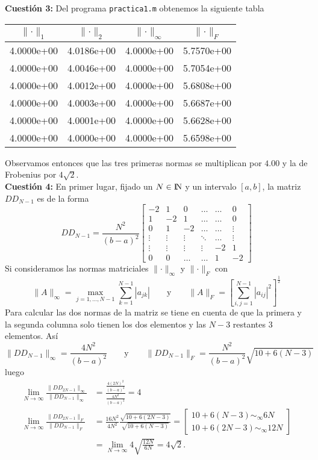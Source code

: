 \documentclass[12pt]{article}
\newcommand{\NN}{{\rm I\!N}}
\newcommand{\abs}[1]{\left|#1\right|}
\newcommand{\norm}[1]{\lVert #1\rVert}
\theoremstyle{definition}
\begin{document}
\noindent\textbf{Cuestión 3:}
Del programa \texttt{practica1.m} obtenemos la siguiente tabla
{ \begin{center}
		\begin{tabular}{ || c | c | c | c || }
			\hline
			$\norm{\cdot}_1$ & $\norm{\cdot}_2$ & $\norm{\cdot}_\infty$ & $\norm{\cdot}_F$ \\
			\hline\hline
			4.0000e+00 & 4.0186e+00 & 4.0000e+00 & 5.7570e+00 \\
			4.0000e+00 & 4.0046e+00 & 4.0000e+00 & 5.7054e+00 \\
			4.0000e+00 & 4.0012e+00 & 4.0000e+00 & 5.6808e+00 \\
			4.0000e+00 & 4.0003e+00 & 4.0000e+00 & 5.6687e+00 \\
			4.0000e+00 & 4.0001e+00 & 4.0000e+00 & 5.6628e+00 \\
			4.0000e+00 & 4.0000e+00 & 4.0000e+00 & 5.6598e+00 \\
			\hline
		\end{tabular}
\end{center}}
Observamos entonces que las tres primeras normas se multiplican por $4.00$ y la de Frobenius por $4\sqrt{2}$. \\
\newline 
\noindent\textbf{Cuestión 4:} En primer lugar, fijado un $N\in\NN$ y un intervalo $[a,b]$, la matriz $DD_{N-1}$ es de la forma
$$DD_{N-1} = \frac{N^2}{(b-a)^2}\begin{bmatrix}
	-2 & 1 & 0 & \dots & \dots & 0 \\
	1 & -2  & 1 & \dots  & \dots  & 0 \\
	0 & 1 & -2 & \dots & \dots & \vdots \\
	\vdots  & \vdots & \vdots & \ddots & \dots & \vdots \\
	\vdots & \vdots & \vdots & \vdots & -2 & 1 \\
	0 & 0 & \dots & \dots & 1 & -2 
\end{bmatrix}$$
Si consideramos las normas matriciales $\norm{\cdot}_\infty$ y $\norm{\cdot}_F$ con
$$\norm{A}_\infty = \max_{j = 1,\dots, N - 1}\sum_{k=1}^{N-1}\abs{a_{jk}} \quad \quad \text{y} \quad \quad \norm{A}_F = \left[\sum_{i,j=1}^{N-1}\abs{a_{ij}}^2\right]^{\frac{1}{2}}$$
Para calcular las dos normas de la matriz se tiene en cuenta de que la primera y la segunda columna solo tienen los dos elementos y las $N - 3$ restantes 3 elementos. Así
$$\norm{DD_{N-1}}_\infty = \frac{4 N^2}{(b - a)^2}\quad \quad \text{y} \quad \quad \norm{DD_{N-1}}_F = \frac{N^2}{(b-a)^2}\sqrt{10 + 6(N - 3)}$$
luego
\begin{align*}
	\lim_{N\to\infty}\frac{\norm{DD_{2N-1}}_\infty}{\norm{DD_{N-1}}_\infty} &= \frac{\frac{4 (2 N)^2}{(b-a)^2}}{\frac{4 N^2}{(b-a)^2}} = 4 \\
	\lim_{N\to\infty}\frac{\norm{DD_{2N-1}}_F}{\norm{DD_{N-1}}_F} &= \frac{16 N^2}{4N^2}\frac{\sqrt{10 + 6(2N - 3)}}{\sqrt{10 + 6(N - 3)}} = \left[\begin{matrix}
		10 + 6(N - 3) \sim_\infty 6N \\
		10 + 6(2N - 3) \sim_\infty 12N
	\end{matrix}\right]  \\
	&= \lim_{N\to\infty} 4 \sqrt{\frac{12 N }{6 N}} = 4 \sqrt{2}.
\end{align*}
\end{document}
